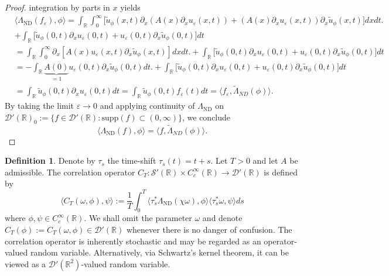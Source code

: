 \documentclass[10pt,a4paper]{article}
\theoremstyle{plain}
\theoremstyle{definition}
\newtheorem{definition}[theorem]{Definition}
\theoremstyle{remark}
\numberwithin{equation}{section}
\newcommand{\R}{\mathbb{R}}
\newcommand{\ND}{\Lambda_{\text{ND}}}
\begin{document}
\begin{proof}
integration by parts in $x$ yields 
\begin{align}
&\langle  \ND (f_\varepsilon), \phi \rangle  = \int_{\R} \int_0^\infty  \bigg[    \tilde{u}_{\phi} (x,t)    \partial_x ( A(x) \partial_x u_{\varepsilon} (x,t)   )   +( A(x) \partial_x u_{\varepsilon} (x,t) )   \partial_x \tilde{u}_{\phi} (x,t)  \bigg] dx dt.  \\
 &+ \int_{\R}   \bigg[  \tilde{u}_{\phi} (0,t)      \partial_x u_{\varepsilon} (0,t)      + u_{\varepsilon} (0,t)    \partial_x \tilde{u}_{\phi} (0,t)  \bigg] dt \\
& = \int_{\R} \int_0^\infty   \partial_x [  A(x) u_{\varepsilon} (x,t)   \partial_x \tilde{u}_{\phi} (x,t)  ]dx dt.  
 + \int_{\R}   \bigg[  \tilde{u}_{\phi} (0,t)      \partial_x u_{\varepsilon} (0,t)     + u_{\varepsilon} (0,t)    \partial_x \tilde{u}_{\phi} (0,t)  \bigg] dt \\
 & = -  \int_{\R}  \underbrace{A(0)}_{=1} u_{\varepsilon} (0,t)   \partial_x \tilde{u}_{\phi} (0,t)   dt.  
 +\int_{\R} \bigg[   \tilde{u}_{\phi} (0,t)      \partial_x u_{\varepsilon} (0,t)     + u_{\varepsilon} (0,t)    \partial_x \tilde{u}_{\phi} (0,t)  \bigg] dt \\
& =  \int_{\R}    \tilde{u}_{\phi} (0,t)      \partial_x u_{\varepsilon} (0,t)   dt =  \int_{\R}     \tilde{u}_{\phi} (0,t)     f_\varepsilon(t)   dt  = \langle f_\varepsilon, \tilde\Lambda_{ND} (\phi) \rangle.
\end{align}
By taking the limit $\varepsilon \to 0$ and applying continuity of $\ND$ on $\mathcal{D}'(\R)_{0} := \{ f \in \mathcal{D}'(\R) : \text{supp} (f) \subset (0,\infty) \}$, we conclude
\[
\langle  \ND ( f ), \phi \rangle  =  \langle f , \tilde\Lambda_{ND} (\phi) \rangle.
\]
\end{proof}



\begin{definition}
  Denote by $\tau_s$ the time-shift $\tau_s(t) = t+s$. Let $T>0$ and let $A$ be admissible. 
  The correlation operator $C_T  : {\mathcal{S}'(\R ) \times  }C^\infty_c ( \R) \to \mathcal{D}'(\R)$ is defined by 
  \begin{equation}\label{eq:correlation-function-def}
    \langle C_T (\omega, \phi ),   \psi  \rangle := \frac1T\int_0^T \langle \tau_s^* \ND (\chi \omega ), \phi  \rangle \langle \tau_s^* \omega,  \psi  \rangle ds
  \end{equation}
  where $\phi, \psi \in C^\infty_c(\R)$. 
   { We shall  omit the parameter  $\omega$ and denote $C_T (\phi):= C_T(\omega,\phi)  \in \mathcal{D}'(\R)$ whenever there is no danger of confusion. 
   }
 {The correlation operator is inherently stochastic and may be regarded as an operator-valued random variable. Alternatively, via Schwartz’s kernel theorem, it can be viewed as a $\mathcal{D}'(\R^2)$-valued random variable.   }
 \end{definition}
\end{document}
